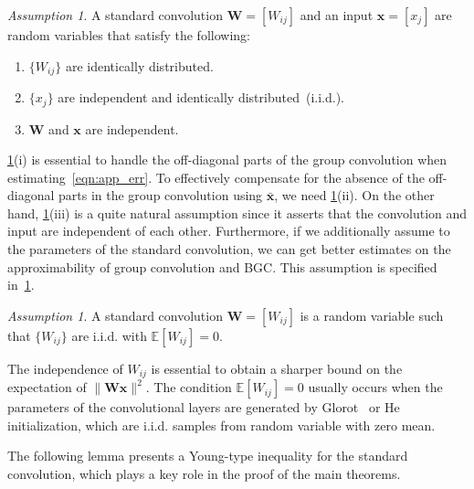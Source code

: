 \documentclass[preprint,12pt,authoryear]{elsarticle}
\numberwithin{equation}{section}
\theoremstyle{remark}
\newtheorem{assumption}[theorem]{Assumption}
\newcommand\bW{\mathbf{W}}
\newcommand\bx{\mathbf{x}}
\newcommand\bbE{\mathbb{E}}
\begin{document}
\begin{assumption}
\label{ass:data}
A standard convolution $\bW = [W_{ij}]$ and an input $\bx = [x_{j}]$ are random variables that satisfy the following:
\begin{enumerate}[label=(\roman*)]
    \item $\{ W_{ij} \}$ are identically distributed.
    \item $\{ x_{j} \}$ are independent and identically distributed~(i.i.d.).
    \item $\bW$ and $\bx$ are independent.
\end{enumerate}
\end{assumption}
\cref{ass:data}(i) is essential to handle the off-diagonal parts of the group convolution when estimating~\eqref{eqn:app_err}.
To effectively compensate for the absence of the off-diagonal parts in the group convolution using $\bar{\bx}$, we need \cref{ass:data}(ii).
On the other hand, \cref{ass:data}(iii) is a quite natural assumption since it asserts that the convolution and input are independent of each other.
Furthermore, if we additionally assume to the parameters of the standard convolution, we can get better estimates on the approximability of group convolution and BGC.
This assumption is specified in~\cref{ass:input}.
\begin{assumption}
\label{ass:input}
A standard convolution $\bW = [W_{ij}]$ is a random variable such that $\{ W_{ij} \}$ are i.i.d. with $\bbE [ W_{ij} ] = 0$.
\end{assumption}
The independence of $W_{ij}$ is essential to obtain a sharper bound on the expectation of $\| \bW\bx \|^{2}$.
The condition $\bbE [ W_{ij} ] = 0$ usually occurs when the parameters of the convolutional layers are generated by Glorot~\citep{glorot10a} or He~\citep{he2015delving} initialization, which are i.i.d. samples from random variable with zero mean.

The following lemma presents a Young-type inequality for the standard convolution, which plays a key role in the proof of the main theorems.
\end{document}
